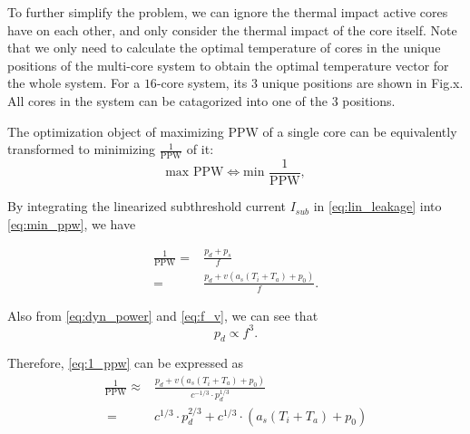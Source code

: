 To further simplify the problem, we can ignore the thermal impact active cores have on each other, and only consider the thermal impact of the core itself. Note that we only need to calculate the optimal temperature of cores in the unique positions of the multi-core system to obtain the optimal temperature vector for the whole system. For a $16$-core system, its $3$ unique positions are shown in Fig.x. All cores in the system can be catagorized into one of the $3$ positions.


The optimization object of maximizing PPW of a single core can be equivalently transformed to minimizing $\frac{1}{\text{PPW}}$ of it:
\begin{equation}\label{eq:min_ppw}
\text{max PPW}\Longleftrightarrow \text{min } \frac{1}{\text{PPW}},
\end{equation}

By integrating the linearized subthreshold current $I_{sub}$ in \eqref{eq:lin_leakage} into \eqref{eq:min_ppw}, we have

\begin{equation}\label{eq:1_ppw}
\begin{split}
\frac{1}{\text{PPW}} = &\frac{p_{d}+p_{s}}{f}\\
= &\frac{p_{d}+v(a_{s}(T_{i}+T_{a})+p_{0})}{f}.
\end{split}
\end{equation}

Also from \eqref{eq:dyn_power} and \eqref{eq:f_v}, we can see that
\begin{equation}\label{eq:pd_prop_f}
p_{d} \propto f^{3}.
\end{equation}

Therefore, \eqref{eq:1_ppw} can be expressed as
\begin{equation}\label{eq:1_ppw_step2}
\begin{split}
\frac{1}{\text{PPW}} \approx  &\frac{p_{d}+v(a_{s}(T_{i}+T_{a})+p_{0})}{c^{-1/3} \cdot p_{d}^{1/3}}\\\
=&c^{1/3}\cdot p_{d}^{2/3}+c^{1/3} \cdot  (a_{s}(T_{i}+T_{a})+p_{0})
\end{split}
\end{equation}

